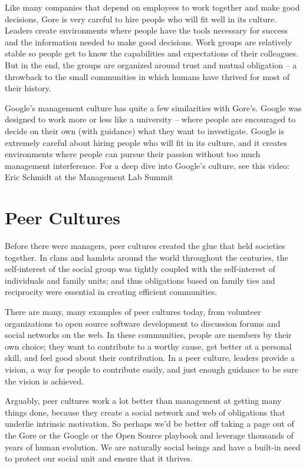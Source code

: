 Like many companies that depend on employees to work together and make good decisions, Gore is very careful to hire people who will fit well in its culture. Leaders create environments where people have the tools necessary for success and the information needed to make good decisions. Work groups are relatively stable so people get to know the capabilities and expectations of their colleagues. But in the end, the groups are organized around trust and mutual obligation – a throwback to the small communities in which humans have thrived for most of their history.

Google’s management culture has quite a few similarities with Gore’s. Google was designed to work more or less like a university – where people are encouraged to decide on their own (with guidance) what they want to investigate. Google is extremely careful about hiring people who will fit in its culture, and it creates environments where people can pursue their passion without too much management interference. For a deep dive into Google’s culture, see this video: Eric Schmidt at the Management Lab Summit

\section{Peer Cultures}

Before there were managers, peer cultures created the glue that held societies together. In clans and hamlets around the world throughout the centuries, the self-interest of the social group was tightly coupled with the self-interest of individuals and family units; and thus obligations based on family ties and reciprocity were essential in creating efficient communities.

There are many, many examples of peer cultures today, from volunteer organizations to open source software development to discussion forums and social networks on the web. In these communities, people are members by their own choice; they want to contribute to a worthy cause, get better at a personal skill, and feel good about their contribution. In a peer culture, leaders provide a vision, a way for people to contribute easily, and just enough guidance to be sure the vision is achieved.

Arguably, peer cultures work a lot better than management at getting many things done, because they create a social network and web of obligations that underlie intrinsic motivation. So perhaps we’d be better off taking a page out of the Gore or the Google or the Open Source playbook and leverage thousands of years of human evolution. We are naturally social beings and have a built-in need to protect our social unit and ensure that it thrives.

